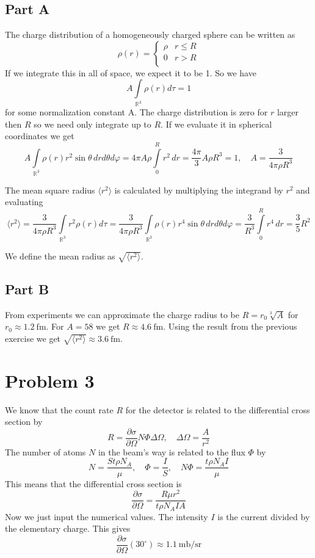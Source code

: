 \documentclass[a4paper, parskip=half, twopage]{scrartcl}
\newcommand{\pd}[2]{\frac {\partial #1}{\partial #2}}
\begin{document}
\subsection*{Part A}
The charge distribution of a homogeneously charged sphere can be written as
\[
\rho(r) = \begin{cases}
\rho & r \leq R \\
0 & r > R \\
\end{cases}
\]
If we integrate this in all of space, we expect it to be 1. So we have
\[
A \int\limits_{\mathbb{R}^3} \rho(r) d\tau = 1
\]
for some normalization constant A. The charge distribution is zero for $r$ larger then $R$ so we need only integrate up to $R$. If we evaluate it in spherical coordinates we get
\[
A \int\limits_{\mathbb{R}^3} \rho(r) r^2 \sin \theta \, dr d\theta d\varphi = 4\pi A \rho \int\limits_{0}^{R} r^2 \, dr = \frac{4 \pi}{3} A \rho R^3 = 1, \quad A = \frac{3}{4 \pi \rho R^3} 
\]

The mean square radius $\langle r^2 \rangle$ is calculated by multiplying the integrand by $r^2$ and evaluating
\[
\langle r^2 \rangle = \frac{3}{4 \pi \rho R^3} \int\limits_{\mathbb{R}^3} r^2 \rho(r) d\tau = \frac{3}{4 \pi \rho R^3} \int\limits_{\mathbb{R}^3} \rho(r) r^4 \sin \theta \, dr d\theta d\varphi = \frac{3}{R^3} \int\limits_{0}^{R} r^4 \, dr = \frac{3}{5} R^2
\]

We define the mean radius as $\sqrt{\langle r^2 \rangle}$.

\subsection*{Part B}

From experiments we can approximate the charge radius to be $R = r_0 \sqrt[3]{A}$ for $r_0 \approx \SI{1.2}{\femto\metre}$. For $A = 58$ we get $R \approx \SI{4.6}{\femto\metre}$. Using the result from the previous exercise we get $\sqrt{\langle r^2 \rangle} \approx \SI{3.6}{\femto\metre}$.

\section*{Problem 3}

We know that the count rate $R$ for the detector is related to the differential cross section by
\[
R = \pd{\sigma}{\Omega} N \Phi {\Delta\Omega}, \quad \Delta\Omega = \frac{A}{r^2}
\]
The number of  atoms $N$ in the beam's way is related to the flux $\Phi$ by
\[
N = \frac{S t \rho N_A}{\mu}, \quad \Phi = \frac{I}{S}, \quad N \Phi = \frac{t \rho N_A I}{\mu}
\]
This means that the differential cross section is
\[
\pd{\sigma}{\Omega} = \frac{R \mu r^2}{t \rho N_A I A}
\]
Now we just input the numerical values. The intensity $I$ is the current divided by the elementary charge. This gives
\[
\pd{\sigma}{\Omega} (30^\circ) \approx \SI{1.1}{\milli\barn\per\steradian}
\]
\end{document}
